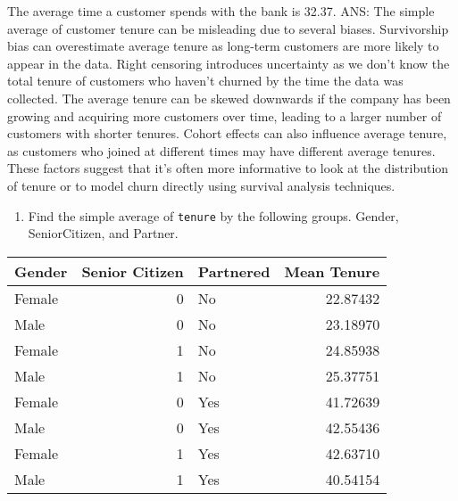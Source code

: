 \documentclass[
]{article}
\newenvironment{Shaded}{\begin{snugshade}}{\end{snugshade}}
\newcommand{\AttributeTok}[1]{\textcolor[rgb]{0.13,0.29,0.53}{#1}}
\newcommand{\CommentTok}[1]{\textcolor[rgb]{0.56,0.35,0.01}{\textit{#1}}}
\newcommand{\FunctionTok}[1]{\textcolor[rgb]{0.13,0.29,0.53}{\textbf{#1}}}
\newcommand{\NormalTok}[1]{#1}
\newcommand{\OtherTok}[1]{\textcolor[rgb]{0.56,0.35,0.01}{#1}}
\newcommand{\SpecialCharTok}[1]{\textcolor[rgb]{0.81,0.36,0.00}{\textbf{#1}}}
\newcommand{\StringTok}[1]{\textcolor[rgb]{0.31,0.60,0.02}{#1}}
\providecommand{\tightlist}{%
  \setlength{\itemsep}{0pt}\setlength{\parskip}{0pt}}
\begin{document}
The average time a customer spends with the bank is 32.37. ANS: The
simple average of customer tenure can be misleading due to several
biases. Survivorship bias can overestimate average tenure as long-term
customers are more likely to appear in the data. Right censoring
introduces uncertainty as we don't know the total tenure of customers
who haven't churned by the time the data was collected. The average
tenure can be skewed downwards if the company has been growing and
acquiring more customers over time, leading to a larger number of
customers with shorter tenures. Cohort effects can also influence
average tenure, as customers who joined at different times may have
different average tenures. These factors suggest that it's often more
informative to look at the distribution of tenure or to model churn
directly using survival analysis techniques.

\begin{enumerate}
\def\labelenumi{\arabic{enumi})}
\setcounter{enumi}{1}
\tightlist
\item
  Find the simple average of \texttt{tenure} by the following groups.
  Gender, SeniorCitizen, and Partner.
\end{enumerate}

\begin{Shaded}
\end{Shaded}

\begin{longtable}[]{@{}lrlr@{}}
\toprule\noalign{}
Gender & Senior Citizen & Partnered & Mean Tenure \\
\midrule\noalign{}
\endhead
\bottomrule\noalign{}
\endlastfoot
Female & 0 & No & 22.87432 \\
Male & 0 & No & 23.18970 \\
Female & 1 & No & 24.85938 \\
Male & 1 & No & 25.37751 \\
Female & 0 & Yes & 41.72639 \\
Male & 0 & Yes & 42.55436 \\
Female & 1 & Yes & 42.63710 \\
Male & 1 & Yes & 40.54154 \\
\end{longtable}
\end{document}
